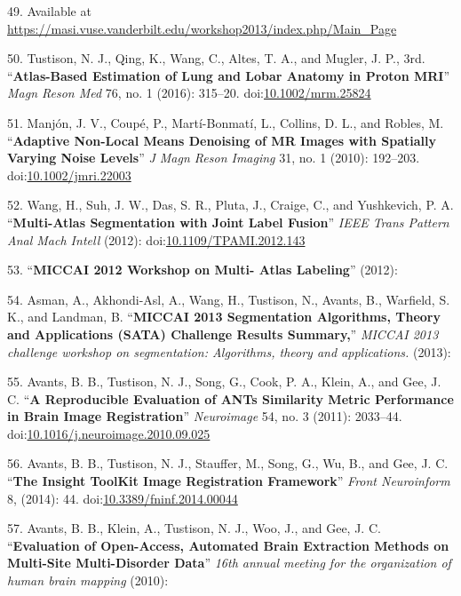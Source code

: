 \documentclass[11pt,]{article}
\begin{document}
\hypertarget{ref-MALF}{}
49. Available at
\url{https://masi.vuse.vanderbilt.edu/workshop2013/index.php/Main_Page}

\hypertarget{ref-Tustison:2016aa}{}
50. Tustison, N. J., Qing, K., Wang, C., Altes, T. A., and Mugler, J.
P., 3rd. ``\textbf{Atlas-Based Estimation of Lung and Lobar Anatomy in
Proton MRI}'' \emph{Magn Reson Med} 76, no. 1 (2016): 315--20.
doi:\href{https://doi.org/10.1002/mrm.25824}{10.1002/mrm.25824}

\hypertarget{ref-Manjon:2010aa}{}
51. Manjón, J. V., Coupé, P., Martí-Bonmatí, L., Collins, D. L., and
Robles, M. ``\textbf{Adaptive Non-Local Means Denoising of MR Images
with Spatially Varying Noise Levels}'' \emph{J Magn Reson Imaging} 31,
no. 1 (2010): 192--203.
doi:\href{https://doi.org/10.1002/jmri.22003}{10.1002/jmri.22003}

\hypertarget{ref-Wang:2012aa}{}
52. Wang, H., Suh, J. W., Das, S. R., Pluta, J., Craige, C., and
Yushkevich, P. A. ``\textbf{Multi-Atlas Segmentation with Joint Label
Fusion}'' \emph{IEEE Trans Pattern Anal Mach Intell} (2012):
doi:\href{https://doi.org/10.1109/TPAMI.2012.143}{10.1109/TPAMI.2012.143}

\hypertarget{ref-Landman2012}{}
53. ``\textbf{MICCAI 2012 Workshop on Multi- Atlas Labeling}'' (2012):

\hypertarget{ref-Asman2013}{}
54. Asman, A., Akhondi-Asl, A., Wang, H., Tustison, N., Avants, B.,
Warfield, S. K., and Landman, B. ``\textbf{MICCAI 2013 Segmentation
Algorithms, Theory and Applications (SATA) Challenge Results Summary,}''
\emph{MICCAI 2013 challenge workshop on segmentation: Algorithms, theory
and applications.} (2013):

\hypertarget{ref-Avants:2011ab}{}
55. Avants, B. B., Tustison, N. J., Song, G., Cook, P. A., Klein, A.,
and Gee, J. C. ``\textbf{A Reproducible Evaluation of ANTs Similarity
Metric Performance in Brain Image Registration}'' \emph{Neuroimage} 54,
no. 3 (2011): 2033--44.
doi:\href{https://doi.org/10.1016/j.neuroimage.2010.09.025}{10.1016/j.neuroimage.2010.09.025}

\hypertarget{ref-Avants:2014aa}{}
56. Avants, B. B., Tustison, N. J., Stauffer, M., Song, G., Wu, B., and
Gee, J. C. ``\textbf{The Insight ToolKit Image Registration Framework}''
\emph{Front Neuroinform} 8, (2014): 44.
doi:\href{https://doi.org/10.3389/fninf.2014.00044}{10.3389/fninf.2014.00044}

\hypertarget{ref-Avants:2010ab}{}
57. Avants, B. B., Klein, A., Tustison, N. J., Woo, J., and Gee, J. C.
``\textbf{Evaluation of Open-Access, Automated Brain Extraction Methods
on Multi-Site Multi-Disorder Data}'' \emph{16th annual meeting for the
organization of human brain mapping} (2010):
\end{document}
